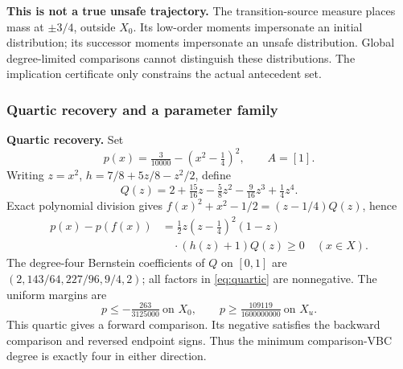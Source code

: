 \documentclass[journal,10pt]{IEEEtran}
\theoremstyle{definition}\newtheorem{definition}{Definition}
\theoremstyle{remark}
\begin{document}
\textbf{This is not a true unsafe trajectory.} The transition-source measure places mass at $\pm3/4$, outside $X_0$. Its low-order moments impersonate an initial distribution; its successor moments impersonate an unsafe distribution. Global degree-limited comparisons cannot distinguish these distributions. The implication certificate only constrains the actual antecedent set.


\subsubsection{Quartic recovery and a parameter family}
\textbf{Quartic recovery.} Set
\[
 p(x)=\tfrac{3}{10000}-(x^2-\tfrac14)^2,\qquad A=[1].
\]
Writing $z=x^2$, $h=7/8+5z/8-z^2/2$, define
\[
 Q(z)=2+\tfrac{15}{16}z-\tfrac58z^2-\tfrac9{16}z^3+\tfrac14z^4.
\]
Exact polynomial division gives $f(x)^2+x^2-1/2=(z-1/4)Q(z)$, hence
\begin{equation}\label{eq:quartic}
\begin{aligned}
 p(x)-p(f(x))&=\tfrac12 z(z-\tfrac14)^2(1-z)\\
 &\quad\cdot(h(z)+1)Q(z)\geq0\quad(x\in X).
\end{aligned}
\end{equation}
The degree-four Bernstein coefficients of $Q$ on $[0,1]$ are $(2,143/64,227/96,9/4,2)$; all factors in \eqref{eq:quartic} are nonnegative. The uniform margins are
\[
 p\leq-\tfrac{263}{3125000}\ \text{on }X_0,\qquad
 p\geq\tfrac{109119}{1600000000}\ \text{on }X_u.
\]
This quartic gives a forward comparison. Its negative satisfies the backward comparison and reversed endpoint signs. Thus the minimum comparison-VBC degree is exactly four in either direction.
\end{document}
